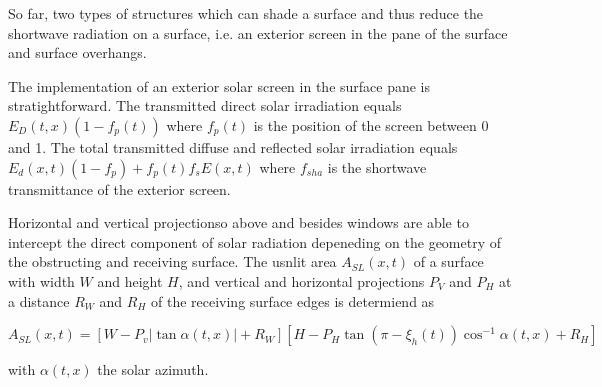 \documentclass{book}
\begin{document}
So far, two types of structures which can shade a surface and thus reduce the shortwave radiation on a surface, i.e. an exterior screen in the pane of the surface and surface overhangs.

The implementation of an exterior solar screen in the surface pane is stratightforward. The transmitted direct solar irradiation equals $E_{D}(t,x) \left(1 - f_{p}(t)\right)$ where $f_{p}(t)$ is the position of the screen between 0 and 1. The total transmitted diffuse and reflected solar irradiation equals $E_{d}(x,t) \left(1 - f_{p}\right) +f_{p}(t)  f_{s} E(x,t)$ where $f_{sha}$ is the shortwave transmittance of the exterior screen.

Horizontal and vertical projectionso above and besides windows are able to intercept the direct component of solar radiation depeneding on the geometry of the obstructing and receiving surface. The usnlit area $A_{SL}(x,t)$ of a surface with width $W$ and height $H$, and vertical and horizontal projections $P_{V}$ and $P_{H}$ at a distance $R_{W}$ and $R_{H}$ of the receiving surface edges is determiend as

\begin{dmath}
A_{SL}(x,t) = \left[W - P_{v}  \left|\tan \alpha(t,x) \right| + R_{W}\right] \left[H - P_{H} \tan \left(\pi - \xi_{h}(t)\right) \cos^{-1} \alpha(t,x) + R_{H}\right]
\end{dmath}

with $\alpha(t,x)$ the solar azimuth.


\end{document}
